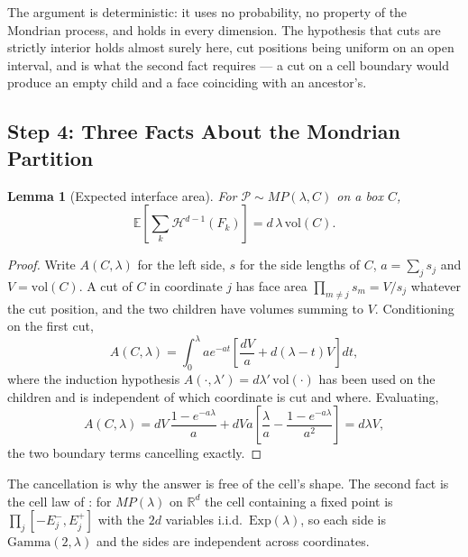 \documentclass[12pt,a4paper]{article}
\numberwithin{equation}{section}
\theoremstyle{plain}
\newtheorem{lemma}{Lemma}
\theoremstyle{definition}
\newcommand{\R}{\mathbb{R}}
\newcommand{\E}{\mathbb{E}}
\begin{document}
	The argument is deterministic: it uses no probability, no property of the
	Mondrian process, and holds in every dimension. The hypothesis that cuts are
	strictly interior holds almost surely here, cut positions being uniform on an
	open interval, and is what the second fact requires --- a cut on a cell
	boundary would produce an empty child and a face coinciding with an
	ancestor's.

	\subsection{Step 4: Three Facts About the Mondrian Partition}

	\begin{lemma}[Expected interface area]
		\label{lem:interface}
		For $\mathcal{P} \sim MP(\lambda, C)$ on a box $C$,
		\begin{equation}
			\E\!\left[\sum_k \mathcal{H}^{d-1}(F_k)\right] = d\,\lambda\,\mathrm{vol}(C).
		\end{equation}
	\end{lemma}

	\begin{proof}
		Write $A(C,\lambda)$ for the left side, $s$ for the side lengths of $C$,
		$a = \sum_j s_j$ and $V = \mathrm{vol}(C)$. A cut of $C$ in coordinate
		$j$ has face area $\prod_{m \neq j} s_m = V/s_j$ whatever the cut
		position, and the two children have volumes summing to $V$. Conditioning
		on the first cut,
		\begin{equation}
			A(C,\lambda) = \int_0^\lambda a e^{-at}
			\left[ \frac{dV}{a} + d(\lambda - t)V \right] dt,
		\end{equation}
		where the induction hypothesis $A(\cdot,\lambda') = d\lambda'\,\mathrm{vol}(\cdot)$
		has been used on the children and is independent of which coordinate is
		cut and where. Evaluating,
		\begin{equation}
			A(C,\lambda)
			= dV\,\frac{1-e^{-a\lambda}}{a}
			+ dVa\left[\frac{\lambda}{a} - \frac{1-e^{-a\lambda}}{a^2}\right]
			= d\lambda V,
		\end{equation}
		the two boundary terms cancelling exactly.
	\end{proof}

	The cancellation is why the answer is free of the cell's shape. The second
	fact is the cell law of \citet{mourtada2017mondrian}: for $MP(\lambda)$ on
	$\R^d$ the cell containing a fixed point is
	$\prod_j [-E_j^-, E_j^+]$ with the $2d$ variables i.i.d.\ $\mathrm{Exp}(\lambda)$,
	so each side is $\mathrm{Gamma}(2,\lambda)$ and the sides are independent
	across coordinates.
\end{document}
